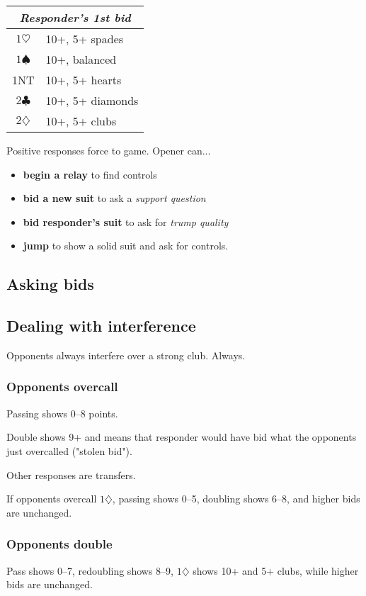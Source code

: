 \documentclass[a4paper, twoside, 11pt]{article}
\begin{document}
\begin{multicols}{3}
\begin{center}
\begin{tabular}{ |c|l| }
 \hline
 \multicolumn{2}{|c|}{\textit{Responder's 1st bid}} \\
 \hline
 $1\heartsuit$ & 10+, 5+ spades\\
 $1\spadesuit$ & 10+,  balanced\\
 \textnormal{1NT}& 10+, 5+ hearts\\
 $2\clubsuit$ & 10+, 5+ diamonds\\
 $2\diamondsuit$ & 10+, 5+ clubs\\
 \hline
\end{tabular}
\end{center}
 Positive responses force to game. Opener can...
 \begin{itemize}
     \item \textbf{begin a relay} to find controls
     \item \textbf{bid a new suit} to ask a \textit{support question}
     \item \textbf{bid responder's suit} to ask for \textit{trump quality}
     \item \textbf{jump} to show a solid suit and ask for controls.
 \end{itemize}

 \subsection*{Asking bids}

 \subsection*{Dealing with interference}
 Opponents always interfere over a strong club. Always.

 \subsubsection*{Opponents overcall}
Passing shows 0--8 points.

Double shows 9+ and means that responder would have bid what the opponents just overcalled ("stolen bid").

Other responses are transfers.

If opponents overcall $1\diamondsuit$, passing shows 0--5, doubling shows 6--8, and higher bids are unchanged.

\subsubsection*{Opponents double}
Pass shows 0--7, redoubling shows 8--9, $1\diamondsuit$ shows 10+ and 5+ clubs, while higher bids are unchanged.


\end{multicols}
\end{document}
